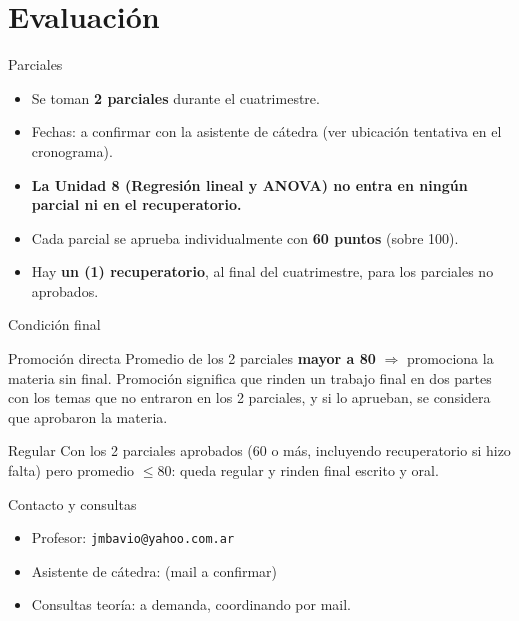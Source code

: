 \documentclass[aspectratio=169,11pt]{beamer}
\begin{document}
\section{Evaluación}

\begin{frame}{Parciales}
\begin{itemize}
\item Se toman \textbf{2 parciales} durante el cuatrimestre.
\item Fechas: a confirmar con la asistente de cátedra (ver ubicación tentativa en el cronograma).
\item \textbf{La Unidad 8 (Regresión lineal y ANOVA) no entra en ningún parcial ni en el recuperatorio.}
\item Cada parcial se aprueba individualmente con \textbf{60 puntos} (sobre 100).
\item Hay \textbf{un (1) recuperatorio}, al final del cuatrimestre, para los parciales no aprobados.
\end{itemize}
\end{frame}

\begin{frame}{Condición final}
\begin{block}{Promoción directa}
Promedio de los 2 parciales \textbf{mayor a 80} $\Rightarrow$ promociona la materia sin final. Promoción significa que rinden un trabajo final en dos partes con los temas que no entraron en los 2 parciales, y si lo aprueban, se considera que aprobaron la materia.
\end{block}

\begin{block}{Regular}
Con los 2 parciales aprobados (60 o más, incluyendo recuperatorio si hizo falta) pero promedio $\le 80$: queda regular y rinden final escrito y oral.
\end{block}
\end{frame}

\begin{frame}{Contacto y consultas}
\begin{itemize}
\item Profesor: \texttt{jmbavio@yahoo.com.ar}
\item Asistente de cátedra: (mail a confirmar)
\item Consultas teoría: a demanda, coordinando por mail.
\end{itemize}
\end{frame}
\end{document}
